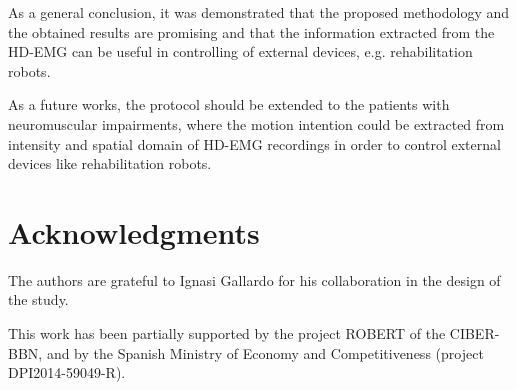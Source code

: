 As a general conclusion, it was demonstrated that the proposed methodology and the obtained results are promising and that the information extracted from the HD-EMG can be useful in controlling of external devices, e.g. rehabilitation robots.

As a future works, the protocol should be extended to the patients with neuromuscular impairments, where the motion intention could be extracted from intensity and spatial domain of HD-EMG recordings in order to control external devices like rehabilitation robots. 

 
 \section{Acknowledgments}
 The authors are grateful to Ignasi Gallardo for his collaboration in the design of the study.
 
 This work has been partially supported by the project ROBERT of the CIBER-BBN, and by the Spanish Ministry of Economy and Competitiveness (project DPI2014-59049-R).

